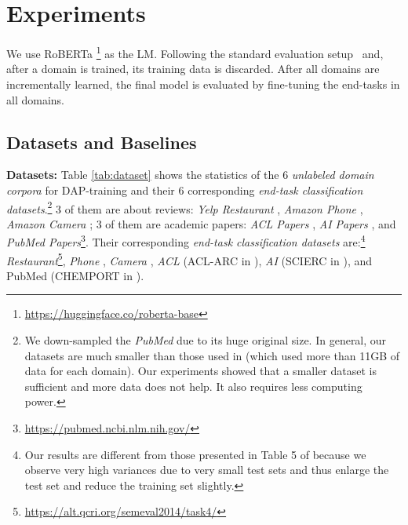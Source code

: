 \documentclass{article} \usepackage{iclr2023_conference,times}
\begin{document}
\section{Experiments}
\label{sec:experiments}



We use RoBERTa \citep{DBLP:journals/corr/abs-1907-11692}\footnote{\url{https://huggingface.co/roberta-base}} as the LM. Following the standard evaluation setup~\citep{DBLP:journals/corr/abs-1909-08383} and, after a domain is trained, its training data is discarded. After all domains are incrementally learned, the final model is evaluated by fine-tuning the end-tasks in all domains. 









\vspace{-1mm}
\subsection{Datasets and Baselines}
\label{sec:data-baselines}
\vspace{-1mm}
\textbf{Datasets:} 
Table \ref{tab:dataset} shows the statistics of the 6 \textit{unlabeled domain corpora} for DAP-training and their 6 corresponding \textit{end-task classification datasets}.\footnote{We down-sampled the \textit{PubMed} due to its huge original size. In general, our datasets are much smaller than those used in  \citep{DBLP:conf/acl/GururanganMSLBD20} (which used more than 11GB of data for each domain). Our experiments showed that a smaller dataset is sufficient and more data does not help. It also requires less computing power.} 3 of them are about reviews: \textit{Yelp Restaurant} \citep{DBLP:conf/naacl/XuLSY19}, \textit{Amazon Phone} \citep{DBLP:conf/emnlp/NiLM19}, \textit{Amazon Camera} \citep{DBLP:conf/emnlp/NiLM19}; 3 of them are academic papers: \textit{ACL Papers} \citep{DBLP:conf/acl/LoWNKW20}, \textit{AI Papers} \citep{DBLP:conf/acl/LoWNKW20}, and \textit{PubMed Papers}\footnote{\url{https://pubmed.ncbi.nlm.nih.gov/}}.
Their corresponding \textit{end-task classification datasets} are:\footnote{Our results are different from those presented in Table 5 of \citep{DBLP:conf/acl/GururanganMSLBD20} because we observe very high variances due to very small test sets and thus enlarge the test set and reduce the training set slightly.} \textit{Restaurant}\footnote{\url{https://alt.qcri.org/semeval2014/task4/}}, \textit{Phone} \citep{ding2008holistic,hu2004mining}, \textit{Camera} \citep{ding2008holistic,hu2004mining}, 
\textit{ACL} (ACL-ARC in \citep{DBLP:journals/tacl/JurgensKHMJ18}), \textit{AI} (SCIERC in \citep{DBLP:conf/emnlp/LuanHOH18}), and PubMed (CHEMPORT in \citep{kringelum2016chemprot}).  
\end{document}

